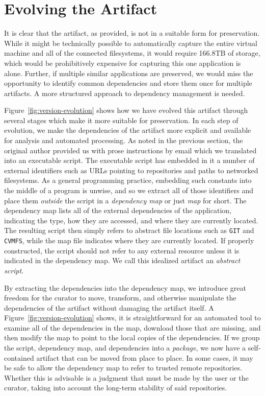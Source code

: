 \documentclass{sig-alternate}
\begin{document}
\fi

\section{Evolving the Artifact}

It is clear that the artifact, as provided, is not in a suitable form
for preservation.  While it might be technically possible to automatically
capture the entire virtual machine and all of the connected filesystems,
it would require 166.8TB of storage, which would be prohibitively expensive
for capturing this one application is alone.  Further, if multiple
similar applications are preserved, we would miss the opportunity to identify
common dependencies and store them once for multiple artifacts.
A more structured approach to dependency management is needed.

Figure~\ref{fig:version-evolution} shows how we have evolved this artifact
through several stages which make it more suitable for preservation.
In each step of evolution, we make the dependencies of the artifact
more explicit and available for analysis and automated processing.
As noted in the previous section, the original author provided us with
prose instructions by email which we translated into an
executable script.  The executable script has embedded in it
a number of external identifiers such as URLs pointing to repositories
and paths to networked filesystems.  As a general programming practice,
embedding such constants into the middle of a program is unwise, and so
we extract all of those identifiers and place them \emph{outside} the
script in a \emph{dependency map} or just \emph{map} for short.
The dependency map lists all of the external dependencies of the application, indicating
the type, how they are accessed, and where they are currently located.
The resulting script then simply refers to abstract file locations such
as \verb$GIT$ and \verb$CVMFS$, while the map file indicates where they
are currently located. If properly constructed, the script should not refer to any external
resource unless it is indicated in the dependency map.  We call this idealized
artifact an \emph{abstract script}.

By extracting the dependencies into the dependency map,
we introduce great freedom for the curator to move, transform, and otherwise
manipulate the dependencies of the artifact without damaging the artifact itself.
A Figure~\ref{fig:version-evolution} shows, it is straightforward for an
automated tool to examine
all of the dependencies in the map, download those that are missing,
and then modify the map to point to the local copies of the dependencies.
If we group the script, dependency map, and dependencies into a \emph{package},
we now have a self-contained artifact that can be moved from place to place.
In some cases, it may be safe to allow the dependency map to refer to 
trusted remote repositories.  Whether this is advisable is a judgment that
must be made by the user or the curator, taking into account the long-term
stability of said repositories.
\end{document}
